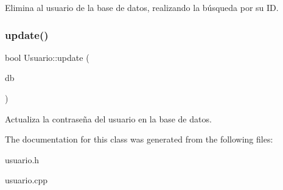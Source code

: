 Elimina al usuario de la base de datos, realizando la búsqueda por su ID. \mbox{\label{classUsuario_af4164d59cbff1c6b19bd489b1cacf743}} 
\subsubsection{\texorpdfstring{update()}{update()}}
{\footnotesize\ttfamily bool Usuario\+::update (\begin{DoxyParamCaption}\item[{Q\+Sql\+Database}]{db }\end{DoxyParamCaption})}

Actualiza la contraseña del usuario en la base de datos. 

The documentation for this class was generated from the following files\+:\begin{DoxyCompactItemize}
\item 
usuario.\+h\item 
usuario.\+cpp\end{DoxyCompactItemize}
